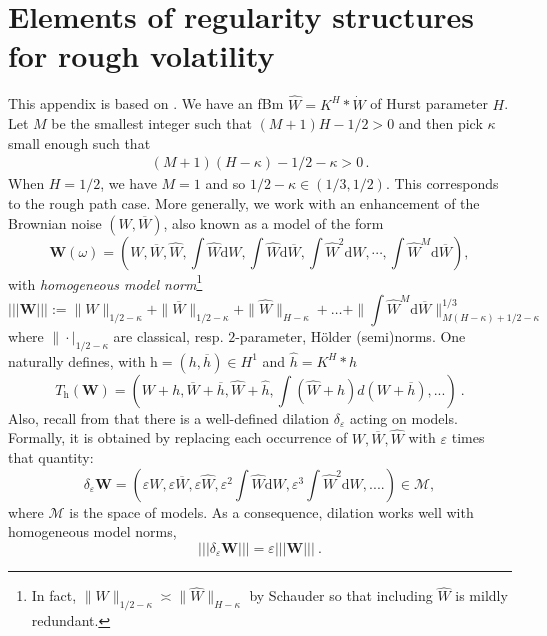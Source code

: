 \documentclass[11pt]{article}
\theoremstyle{plain}
\theoremstyle{definition}
\theoremstyle{remark}
\renewcommand{\bar}{\overline}
\renewcommand{\hat}{\widehat}
\newcommand{\dd}{\mathrm{d}}
\newcommand{\1}{\mathbf{1}}
\numberwithin{equation}{section}
\def\bh{\bar{h}}
\def\eps{\varepsilon}
\def\WW{\mathbf W}
\def\h{\mathrm h}
\def\M{\mathcal M}
\begin{document}


\appendix

\section{Elements of regularity structures for rough volatility}\label{appendix:reg:str}

\noindent This appendix is based on \cite{bayer2017regularity,friz2018precise1}. 
We have an fBm $\hat W= K^H * \dot{W} $ of Hurst parameter $H$.
Let $M$ be the smallest integer such that
$ (M+1)H-1/2>0$ and then pick $\kappa$ small enough such that 
\begin{align}  \label{eq:condonkappa}
(M+1)(H-\kappa)-1/2-\kappa >0\,.
\end{align}
When $H=1/2$, we have $M=1$ and so $1/2-\kappa \in (1/3,1/2)$. This corresponds to 
the rough path case. 
More generally, we work with an enhancement of the Brownian noise $(W, \bar W)$, also known as a model of the form
\begin{equation}\label{def:model}
\WW (\omega) =  \left(W, \bar W, \hat W, \int \hat W \dd W , \int \hat W \dd \bar W,  \int \hat W^2 \dd W, \cdots, \int \hat W^M  \dd \bar W \right),
\end{equation}
with \emph{homogeneous model norm}\footnote{In fact, $\| W \|_{1/2-\kappa} \asymp   \| \hat W \|_{H-\kappa}$ by Schauder so that including $\hat W$ is mildly redundant.}$$
        ||| \WW |||  :=    \| W \|_{1/2-\kappa} + \| \bar W \|_{1/2-\kappa} +  \| \hat W \|_{H-\kappa} + \dots + \|  \int \hat W^M  \dd \bar W \|^{1/3}_{M(H-\kappa)+1/2 - \kappa}
$$
where  $\| \cdot|_{1/2-\kappa}$ are classical, resp. $2$-parameter, H\"older (semi)norms. %
One naturally defines, with $\h = (h,\bh)\in H^1$ and $\hat h=K^H*h$
\begin{equation}\label{def:T}
         T_{\h}  (\WW) =  \left(W+h, \bar W+ \bh, \hat W+ \hat h, \int (\hat W +  \hat h) d(W+\bh), ... \right) \ .
\end{equation}
Also, recall from \cite{bayer2017regularity} that there is a well-defined dilation $\delta_\eps$ acting on models. Formally, it is obtained by replacing 
each occurrence of $W, \bar W, \hat W$ with $\eps$ times that quantity:
 $$
          \delta_\eps \WW = \left(\eps W, \eps \bar{W},\eps \hat{W}, \eps^2 \int \hat W \dd W,  \eps^3 \int \hat W^2 \dd W , ....\right) \in \M ,
 $$
 where $\M$ is the space of models.
As a consequence, dilation works well with homogeneous model norms,
$$
 ||| \delta_\eps \WW ||| = \eps ||| \WW ||| \ .
$$
\end{document}
